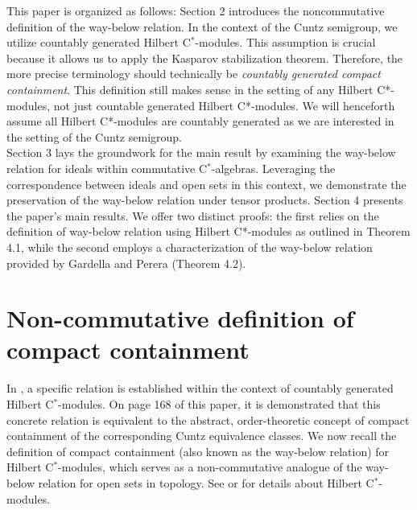 \documentclass{iopconfser}
\theoremstyle{definition}
\begin{document}
This paper is organized as follows: Section 2 introduces the noncommutative definition of the way-below relation. In the context of the Cuntz semigroup, we utilize countably generated Hilbert C$^*$-modules. This assumption is crucial because it allows us to apply the Kasparov stabilization theorem. Therefore, the more precise terminology should technically be \textit{countably generated compact containment}. This definition still makes sense in the setting of any Hilbert C*-modules, not just countable generated Hilbert C*-modules. We will henceforth assume all Hilbert C*-modules are countably generated as we are interested in the setting of the Cuntz semigroup.\\


 Section 3 lays the groundwork for the main result by examining the way-below relation for ideals within commutative C$^*$-algebras. Leveraging the correspondence between ideals and open sets in this context, we demonstrate the preservation of the way-below relation under tensor products. 
Section 4 presents the paper's main results. We offer two distinct proofs: the first relies on the definition of way-below relation using Hilbert C*-modules as outlined in Theorem 4.1, while the second employs a characterization of the way-below relation provided by Gardella and Perera (Theorem 4.2).

\section{Non-commutative definition of compact containment}

In \cite{CEI}, a specific relation is established within the context of countably generated Hilbert C$^*$-modules. On page 168 of this paper, it is demonstrated that this concrete relation is equivalent to the abstract, order-theoretic concept of compact containment of the corresponding Cuntz equivalence classes. We now recall the definition of compact containment (also known as the way-below relation) for Hilbert C$^*$-modules, which serves as a non-commutative analogue of the way-below relation for open sets in topology. 
See \cite{Lan} or \cite{Man} for details about Hilbert C$^*$-modules.
\end{document}
